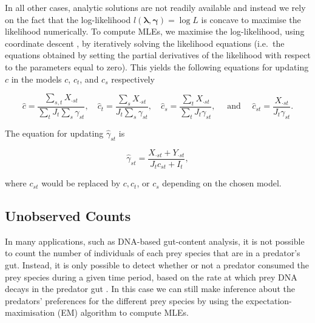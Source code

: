 \documentclass[smallextended]{svjour3}
\begin{document}
In all other cases, analytic solutions are not readily available and instead we rely on the fact that the log-likelihood $l(\boldsymbol{\lambda}, \boldsymbol{\gamma}) = \log{L}$ is concave to maximise the likelihood numerically.  To compute MLEs, we maximise the log-likelihood, using coordinate descent \citep{Luo:1992}, by iteratively solving the likelihood equations (i.e.\, the equations obtained by setting the partial derivatives of the likelihood with respect to the parameters equal to zero).  This yields the following equations for updating $c$ in the models $c$, $c_t$, and $c_s$ respectively

\begin{equation*}
  \hat{c} = \frac{\sum_{s,t} X_{\cdot st}}{\sum_t J_t \sum_s \gamma_{st}}, \quad \hat{c}_t =  \frac{\sum_s X_{\cdot st}}{J_t \sum_s \gamma_{st}}, \quad \hat{c}_s = \frac{\sum_{t}X_{\cdot st}}{\sum_t J_t \gamma_{st}}, \quad \text{ and } \quad \hat{c}_{st} = \frac{X_{\cdot st}}{J_t \gamma_{st}}.
\end{equation*}

\noindent The equation for updating $\hat \gamma_{st}$ is

\[ \hat{\gamma}_{st} = \frac{X_{\cdot st} + Y_{\cdot st}}{J_t c_{st} + I_t}, \]

\noindent where $c_{st}$ would be replaced by $c, c_t$, or $c_s$ depending on the chosen model.

\subsection{Unobserved Counts}
\label{sec:noncount}

In many applications, such as DNA-based gut-content analysis, it is not possible to count the number of individuals of each prey species that are in a predator's gut.  Instead, it is only possible to detect whether or not a predator consumed the prey species during a given time period, based on the rate at which prey DNA decays in the predator gut \citep{Greenstone:2013}.  In this case we can still make inference about the predators' preferences for the different prey species by using the expectation-maximisation (EM) algorithm to compute MLEs.
\end{document}

